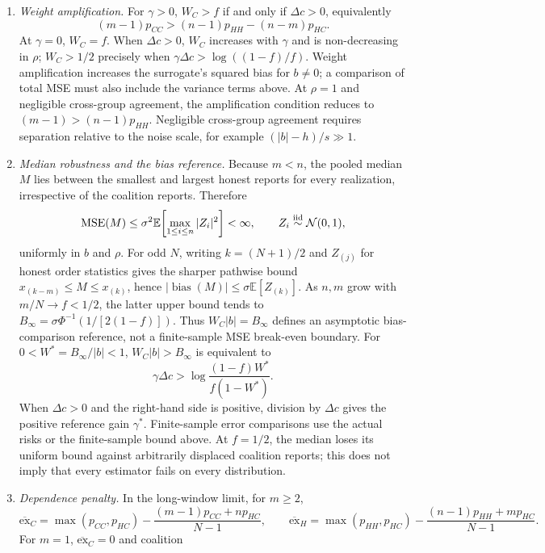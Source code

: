 \begin{enumerate}
\def\labelenumi{\arabic{enumi}.}
\item
  \emph{Weight amplification.} For \(\gamma>0\), \(W_C>f\) if and only
  if \(\Delta c>0\), equivalently \[
  (m-1)p_{CC}>(n-1)p_{HH}-(n-m)p_{HC}.
  \] At \(\gamma=0\), \(W_C=f\). When \(\Delta c>0\), \(W_C\) increases
  with \(\gamma\) and is non-decreasing in \(\rho\); \(W_C>1/2\)
  precisely when \(\gamma\Delta c>\log((1-f)/f)\). Weight amplification
  increases the surrogate's squared bias for \(b\ne0\); a comparison of
  total MSE must also include the variance terms above. At \(\rho=1\)
  and negligible cross-group agreement, the amplification condition
  reduces to \((m-1)>(n-1)p_{HH}\). Negligible cross-group agreement
  requires separation relative to the noise scale, for example
  \((|b|-h)/s\gg1\).
\item
  \emph{Median robustness and the bias reference.} Because \(m<n\), the
  pooled median \(M\) lies between the smallest and largest honest
  reports for every realization, irrespective of the coalition reports.
  Therefore \[
  \operatorname{MSE}(M)\le\sigma^2\mathbb E\!\left[\max_{1\le i\le n}|Z_i|^2\right]<\infty,
  \qquad Z_i\stackrel{\rm iid}{\sim}\mathcal N(0,1),
  \] uniformly in \(b\) and \(\rho\). For odd \(N\), writing
  \(k=(N+1)/2\) and \(Z_{(j)}\) for honest order statistics gives the
  sharper pathwise bound \(x_{(k-m)}\le M\le x_{(k)}\), hence
  \(|\operatorname{bias}(M)|\le\sigma\mathbb E[Z_{(k)}]\). As \(n,m\)
  grow with \(m/N\to f<1/2\), the latter upper bound tends to
  \(B_\infty=\sigma\Phi^{-1}(1/[2(1-f)])\). Thus \(W_C|b|=B_\infty\)
  defines an asymptotic bias-comparison reference, not a finite-sample
  MSE break-even boundary. For \(0<W^*=B_\infty/|b|<1\),
  \(W_C|b|>B_\infty\) is equivalent to \[
  \gamma\Delta c>\log\!\frac{(1-f)W^*}{f(1-W^*)}.
  \] When \(\Delta c>0\) and the right-hand side is positive, division
  by \(\Delta c\) gives the positive reference gain \(\gamma^*\).
  Finite-sample error comparisons use the actual risks or the
  finite-sample bound above. At \(f=1/2\), the median loses its uniform
  bound against arbitrarily displaced coalition reports; this does not
  imply that every estimator fails on every distribution.
\item
  \emph{Dependence penalty.} In the long-window limit, for \(m\ge2\), \[
  \overline{\mathrm{ex}}_C=\max(p_{CC},p_{HC})-\frac{(m-1)p_{CC}+np_{HC}}{N-1},\qquad
  \overline{\mathrm{ex}}_H=\max(p_{HH},p_{HC})-\frac{(n-1)p_{HH}+mp_{HC}}{N-1}.
  \] For \(m=1\), \(\overline{\mathrm{ex}}_C=0\) and coalition

\end{enumerate}
